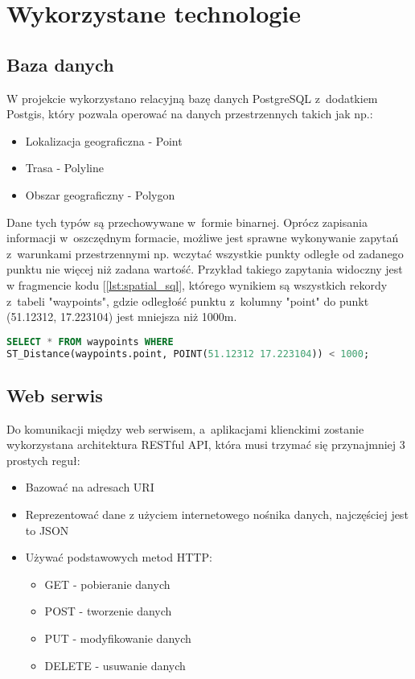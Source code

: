 \documentclass[eng,archivemode]{mgr}
\begin{document}
\chapter{Wykorzystane technologie}

\section{Baza danych}
W projekcie wykorzystano relacyjną bazę danych PostgreSQL z~dodatkiem Postgis, który pozwala operować na danych przestrzennych takich jak np.:
\begin{itemize}
	\item Lokalizacja geograficzna - Point
	\item Trasa - Polyline
	\item Obszar geograficzny - Polygon
\end{itemize}
Dane tych typów są przechowywane w~formie binarnej. Oprócz zapisania informacji w~oszczędnym formacie, możliwe jest sprawne wykonywanie zapytań z~warunkami przestrzennymi np. wczytać wszystkie punkty odległe od zadanego punktu nie więcej niż zadana wartość. Przykład takiego zapytania widoczny jest w fragmencie kodu [\ref{lst:spatial_sql}, którego wynikiem są wszystkich rekordy z~tabeli "waypoints", gdzie odległość punktu z~kolumny "point" do punkt (51.12312, 17.223104) jest mniejsza niż 1000m.

\begin{lstlisting}[language=SQL, caption={Przykład zapytania SQL z~użyciem operacji na danych przestrzennych}, label={lst:spatial_sql}]
SELECT * FROM waypoints WHERE
ST_Distance(waypoints.point, POINT(51.12312 17.223104)) < 1000;
\end{lstlisting} 
\newpage
\section{Web serwis}
Do komunikacji między web serwisem, a~aplikacjami klienckimi zostanie wykorzystana architektura RESTful API, która musi trzymać się przynajmniej 3 prostych reguł\cite{rails api}:
\begin{itemize}
	\item Bazować na adresach URI
	\item Reprezentować dane z użyciem internetowego nośnika danych, najczęściej jest to JSON
	\item Używać podstawowych metod HTTP:
	\begin{itemize}
		\item GET - pobieranie danych
		\item POST - tworzenie danych
		\item PUT - modyfikowanie danych
		\item DELETE - usuwanie danych
	\end{itemize}
\end{itemize}
\end{document}
